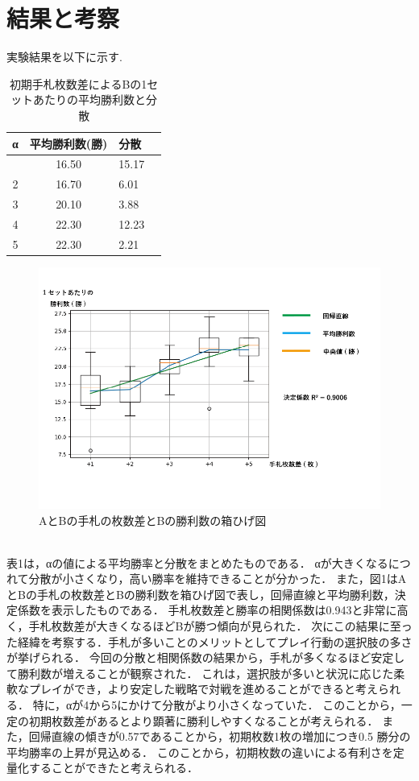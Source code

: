 \documentclass[twocolumn]{ltjsarticle}
\begin{document}
\section{結果と考察}
\small{
  実験結果を以下に示す.
}
\begin{table}[h]
  \centering
  \caption{初期手札枚数差によるBの1セットあたりの平均勝利数と分散}
  \begin{tabular}{clll}
    α &平均勝利数(勝)& 分散\\
    \hline \hline
    \centering
    1&\multicolumn{1}{c}{16.50}&\multicolumn{1}{l}{15.17}\\
    2&\multicolumn{1}{c}{16.70}&\multicolumn{1}{l}{6.01}\\
    3&\multicolumn{1}{c}{20.10}&\multicolumn{1}{l}{3.88}\\
    4&\multicolumn{1}{c}{22.30}&\multicolumn{1}{l}{12.23}\\
    5&\multicolumn{1}{c}{22.30}&\multicolumn{1}{l}{2.21}\\
    \hline%
  \end{tabular}
\end{table}
\begin{figure}[h]
  \centering
  \includegraphics[scale = 0.3]{graph1.png}
  \caption{AとBの手札の枚数差とBの勝利数の箱ひげ図}
\end{figure}
\small{
\\
表1は，αの値による平均勝率と分散をまとめたものである．
αが大きくなるにつれて分散が小さくなり，高い勝率を維持できることが分かった．
また，図1はAとBの手札の枚数差とBの勝利数を箱ひげ図で表し，回帰直線と平均勝利数，決定係数を表示したものである．
手札枚数差と勝率の相関係数は0.943と非常に高く，手札枚数差が大きくなるほどBが勝つ傾向が見られた．
次にこの結果に至った経緯を考察する．手札が多いことのメリットとしてプレイ行動の選択肢の多さが挙げられる．
今回の分散と相関係数の結果から，手札が多くなるほど安定して勝利数が増えることが観察された．
これは，選択肢が多いと状況に応じた柔軟なプレイができ，より安定した戦略で対戦を進めることができると考えられる．
特に，αが4から5にかけて分散がより小さくなっていた．
このことから，一定の初期枚数差があるとより顕著に勝利しやすくなることが考えられる．
また，回帰直線の傾きが0.57であることから，初期枚数1枚の増加につき0.5 勝分の平均勝率の上昇が見込める．
このことから，初期枚数の違いによる有利さを定量化することができたと考えられる．
}
\end{document}
